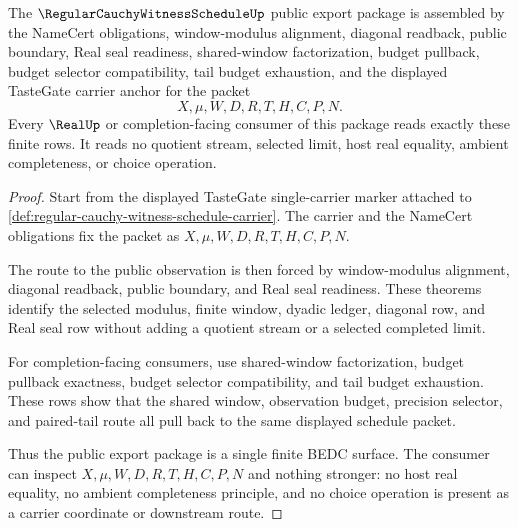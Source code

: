 \begin{theorem}
\label{thm:regular-cauchy-witness-schedule-public-export-package}
The $\RegularCauchyWitnessScheduleUp$ public export package is assembled by the NameCert obligations, window-modulus alignment, diagonal readback, public boundary, Real seal readiness, shared-window factorization, budget pullback, budget selector compatibility, tail budget exhaustion, and the displayed TasteGate carrier anchor for the packet
$$
X,\mu,W,D,R,T,H,C,P,N.
$$
Every $\RealUp$ or completion-facing consumer of this package reads exactly these finite rows. It reads no quotient stream, selected limit, host real equality, ambient completeness, or choice operation.
\end{theorem}
\begin{proof}
Start from the displayed TasteGate single-carrier marker attached to \autoref{def:regular-cauchy-witness-schedule-carrier}. The carrier and the NameCert obligations fix the packet as $X,\mu,W,D,R,T,H,C,P,N$.

The route to the public observation is then forced by window-modulus alignment, diagonal readback, public boundary, and Real seal readiness. These theorems identify the selected modulus, finite window, dyadic ledger, diagonal row, and Real seal row without adding a quotient stream or a selected completed limit.

For completion-facing consumers, use shared-window factorization, budget pullback exactness, budget selector compatibility, and tail budget exhaustion. These rows show that the shared window, observation budget, precision selector, and paired-tail route all pull back to the same displayed schedule packet.

Thus the public export package is a single finite BEDC surface. The consumer can inspect $X,\mu,W,D,R,T,H,C,P,N$ and nothing stronger: no host real equality, no ambient completeness principle, and no choice operation is present as a carrier coordinate or downstream route.
\end{proof}

